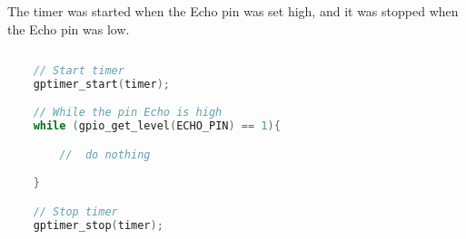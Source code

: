 \documentclass[../report.tex]{subfiles}
\begin{document}
The timer was started when the Echo pin was set high, and it was
 stopped when the Echo pin was low.

 \begin{lstlisting}[language=c,caption={The timer's code},label={code:ultrasonic}]
    
    // Start timer 
    gptimer_start(timer);

    // While the pin Echo is high
    while (gpio_get_level(ECHO_PIN) == 1){

        //  do nothing

    }

    // Stop timer
    gptimer_stop(timer);



\end{lstlisting}
\end{document}

